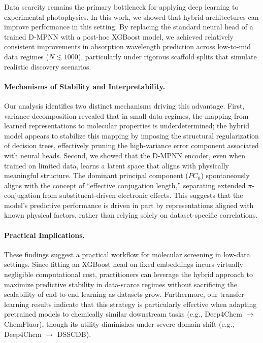 Data scarcity remains the primary bottleneck for applying deep learning to experimental photophysics. In this work, we showed that hybrid architectures can improve performance in this setting. By replacing the standard neural head of a trained D-MPNN with a post-hoc XGBoost model, we achieved relatively consistent improvements in absorption wavelength prediction across low-to-mid data regimes ($N \lesssim 1000$), particularly under rigorous scaffold splits that simulate realistic discovery scenarios.

\paragraph{Mechanisms of Stability and Interpretability.}
Our analysis identifies two distinct mechanisms driving this advantage. First, variance decomposition revealed that in small-data regimes, the mapping from learned representations to molecular properties is underdetermined; the hybrid model appears to stabilize this mapping by imposing the structural regularization of decision trees, effectively pruning the high-variance error component associated with neural heads. Second, we showed that the D-MPNN encoder, even when trained on limited data, learns a latent space that aligns with physically meaningful structure. The dominant principal component ($PC_0$) spontaneously aligns with the concept of ``effective conjugation length,'' separating extended $\pi$-conjugation from substituent-driven electronic effects. This suggests that the model’s predictive performance is driven in part by representations aligned with known physical factors, rather than relying solely on dataset-specific correlations.

\paragraph{Practical Implications.}
These findings suggest a practical workflow for molecular screening in low-data settings. Since fitting an XGBoost head on fixed embeddings incurs virtually negligible computational cost, practitioners can leverage the hybrid approach to maximize predictive stability in data-scarce regimes without sacrificing the scalability of end-to-end learning as datasets grow. Furthermore, our transfer learning results indicate that this strategy is particularly effective when adapting pretrained models to chemically similar downstream tasks (e.g., Deep4Chem $\to$ ChemFluor), though its utility diminishes under severe domain shift (e.g., Deep4Chem $\to$ DSSCDB).

